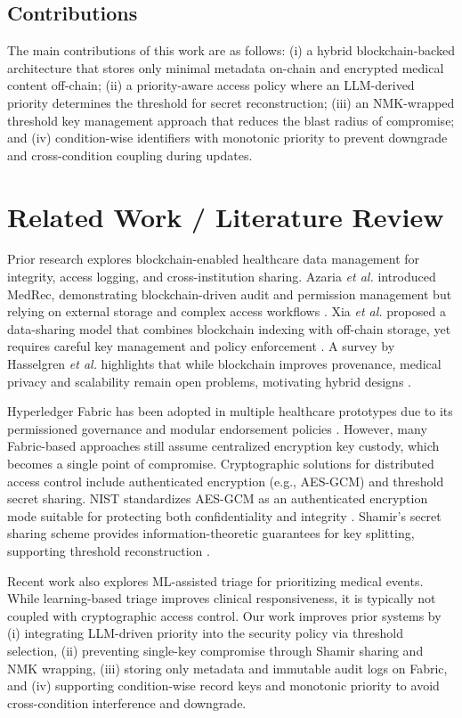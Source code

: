 \documentclass{IEEEtran}
\begin{document}
\subsection{Contributions}
The main contributions of this work are as follows: (i) a hybrid blockchain-backed architecture that stores only minimal metadata on-chain and encrypted medical content off-chain; (ii) a priority-aware access policy where an LLM-derived priority determines the threshold for secret reconstruction; (iii) an NMK-wrapped threshold key management approach that reduces the blast radius of compromise; and (iv) condition-wise identifiers with monotonic priority to prevent downgrade and cross-condition coupling during updates.

\section{Related Work / Literature Review}
Prior research explores blockchain-enabled healthcare data management for integrity, access logging, and cross-institution sharing. Azaria \emph{et al.} introduced MedRec, demonstrating blockchain-driven audit and permission management but relying on external storage and complex access workflows \cite{b1}. Xia \emph{et al.} proposed a data-sharing model that combines blockchain indexing with off-chain storage, yet requires careful key management and policy enforcement \cite{b2}. A survey by Hasselgren \emph{et al.} highlights that while blockchain improves provenance, medical privacy and scalability remain open problems, motivating hybrid designs \cite{b3}.

Hyperledger Fabric has been adopted in multiple healthcare prototypes due to its permissioned governance and modular endorsement policies \cite{b4}. However, many Fabric-based approaches still assume centralized encryption key custody, which becomes a single point of compromise. Cryptographic solutions for distributed access control include authenticated encryption (e.g., AES-GCM) and threshold secret sharing. NIST standardizes AES-GCM as an authenticated encryption mode suitable for protecting both confidentiality and integrity \cite{b5}. Shamir's secret sharing scheme provides information-theoretic guarantees for key splitting, supporting threshold reconstruction \cite{b6}.

Recent work also explores ML-assisted triage for prioritizing medical events. While learning-based triage improves clinical responsiveness, it is typically not coupled with cryptographic access control. Our work improves prior systems by (i) integrating LLM-driven priority into the security policy via threshold selection, (ii) preventing single-key compromise through Shamir sharing and NMK wrapping, (iii) storing only metadata and immutable audit logs on Fabric, and (iv) supporting condition-wise record keys and monotonic priority to avoid cross-condition interference and downgrade.
\end{document}
